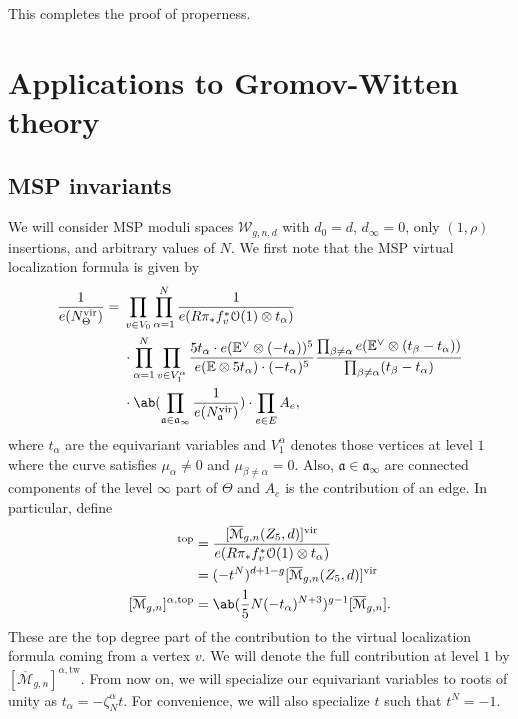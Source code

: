 \documentclass[10pt,oldfontcommands,oneside]{memoir}
\theoremstyle{definition}
\theoremstyle{remark}
\theoremstyle{plain}
\theoremstyle{definition}
\theoremstyle{remark}
\newcommand{\E}{\mathbb{E}}
\newcommand{\Mbar}{\overline{\mathcal{M}}}
\newcommand{\mc}[1]{\mathcal{#1}}
\newcommand{\mf}[1]{\mathfrak{#1}}
\newcommand{\mr}[1]{\mathrm{#1}}
\newcommand{\1}{\mathbf{1}}
\newcommand{\2}{\mathbf{2}}
\newcommand{\3}{\mathbf{3}}
\newcommand{\vir}{\mr{vir}}
\newcommand{\tw}{\mr{tw}}
\begin{document}
This completes the proof of properness.



\section{Applications to Gromov-Witten theory}%
\label{sec:Applications to Gromov-Witten theory}

\subsection{MSP invariants}%
\label{sub:MSP invariants}

We will consider MSP moduli spaces $\mc{W}_{g,n,d}$ with $d_0 = d$, $d_{\infty} = 0$, only $(1,\rho)$ insertions, and arbitrary values of $N$. We first note that the MSP virtual localization formula is given by
\begin{align*}
    \frac{1}{e(N_{\Theta}^{\vir})} ={}& \prod_{v \in V_0} \prod_{\alpha=1}^N \frac{1}{e(R \pi_* f_v^* \mc{O}(1) \otimes t_{\alpha})} \\
    & \cdot \prod_{\alpha=1}^N \prod_{v \in V_1^{\alpha}} \frac{5 t_{\alpha} \cdot e(\E^{\vee}\otimes (-t_{\alpha}))^5}{e(\E \otimes 5 t_{\alpha})\cdot (-t_{\alpha})^5} \frac{\prod_{\beta \neq \alpha} e(\E^{\vee} \otimes (t_{\beta} - t_{\alpha}))}{\prod_{\beta \neq \alpha} (t_{\beta} - t_{\alpha})} \\
    &\cdot \ab( \prod_{\mf{a} \in \mf{a}_{\infty}} \frac{1}{e(N_{\mf{a}}^{\vir})} ) \cdot \prod_{e \in E} A_e,
\end{align*}
where $t_{\alpha}$ are the equivariant variables and $V_1^{\alpha}$ denotes those vertices at level $1$ where the curve satisfies $\mu_{\alpha} \neq 0$ and $\mu_{\beta \neq \alpha} = 0$. Also, $\mf{a} \in \mf{a}_{\infty}$ are connected components of the level $\infty$ part of $\Theta$ and $A_e$ is the contribution of an edge. In particular, define
\begin{align*}
    [\Mbar_{g,n}(Z_5,d)]^{\mr{top}} &= \frac{[\Mbar_{g,n}(Z_5,d)]^{\vir}}{e(R\pi_* f_v^* \mc{O}(1) \otimes t_{\alpha})} \\
    &= (-t^N)^{d+1-g} [\Mbar_{g,n}(Z_5,d)]^{\vir} \\
    [\Mbar_{g,n}]^{\alpha,\mr{top}} &= \ab(\frac{1}{5}N(-t_{\alpha})^{N+3})^{g-1} [\Mbar_{g,n}].
\end{align*}
These are the top degree part of the contribution to the virtual localization formula coming from a vertex $v$. We will denote the full contribution at level $1$ by $[\Mbar_{g,n}]^{\alpha,\tw}$. From now on, we will specialize our equivariant variables to roots of unity as $t_{\alpha} = -\zeta_N^{\alpha} t$. For convenience, we will also specialize $t$ such that $t^N = -1$.
\end{document}
